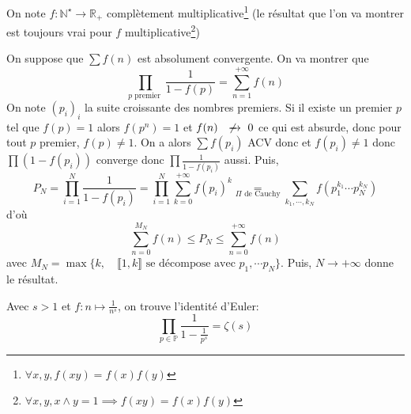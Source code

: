 \begin{ex}
    On note $f:\mathbb N^\star\longrightarrow \mathbb R_+$ complètement multiplicative\footnote{$\forall x,y, f(xy)=f(x)f(y)$} (le résultat que l'on va montrer est toujours vrai pour $f$ multiplicative\footnote{$\forall x,y, x\land y=1\implies f(xy)=f(x)f(y)$})

    On suppose que $\sum f(n)$ est absolument convergente. On va montrer que \[
        \prod_{p\text{ premier }} \frac1{1-f(p)}=\sum_{n=1}^{+\infty}f(n)
    \]
    On note $(p_i)_i$ la suite croissante des nombres premiers. Si il existe un premier $p$ tel que $f(p)=1$ alors $f(p^n)=1$ et $f(n)\xnrightarrow{}0$ ce qui est absurde, donc pour tout $p$ premier, $f(p)\neq 1$.
    On a alors $\sum f(p_i)$ ACV donc et $f(p_i)\neq 1$ donc $\prod (1-f(p_i))$ converge donc $\prod \frac1{1-f(p_i)}$ aussi. Puis, \[
        P_N=\prod_{i=1}^N\frac1{1-f(p_i)}=\prod_{i=1}^N \sum_{k=0}^{+\infty}f(p_i)^k\underset{\Pi\text{ de Cauchy}}=\sum_{k_1, \cdots, k_N}f(p_1^{k_1}\cdots p_N^{k_N})
    \]
    d'où \[
        \sum_{n=0}^{M_N}f(n)\leq P_N\leq\sum_{n=0}^{+\infty}f(n)
    \]
    avec $M_N=\max \{k, \quad \llbracket 1, k\rrbracket\text{ se décompose avec } p_1, \cdots p_N\}$. Puis, $N\to+\infty$ donne le résultat.
\end{ex}

Avec $s>1$ et $f:n\longmapsto \frac1{n^s}$, on trouve l'identité d'Euler: \[
    \prod_{p\in\mathbb P}\frac1{1-\frac1{p^s}}=\zeta(s)
\]

\endchapter
